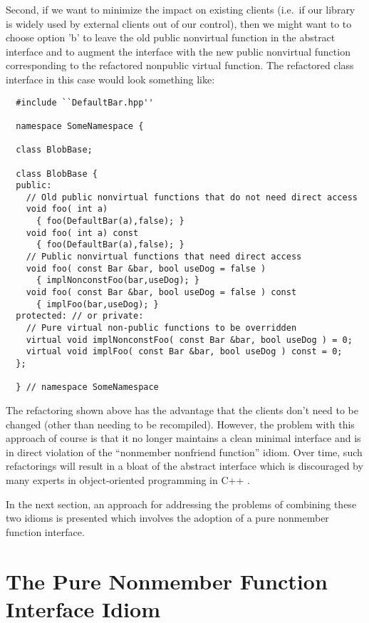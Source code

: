 \documentclass[pdf,ps2pdf,11pt]{SANDreport}
\begin{document}
Second, if we want to minimize the impact on existing clients (i.e.\ if our
library is widely used by external clients out of our control), then we might
want to to choose option 'b' to leave the old public nonvirtual function in
the abstract interface and to augment the interface with the new public
nonvirtual function corresponding to the refactored nonpublic virtual
function.  The refactored class interface in this case would look something
like:

{\small\begin{verbatim}
  #include ``DefaultBar.hpp''

  namespace SomeNamespace {

  class BlobBase;

  class BlobBase {
  public:
    // Old public nonvirtual functions that do not need direct access
    void foo( int a)
      { foo(DefaultBar(a),false); }
    void foo( int a) const
      { foo(DefaultBar(a),false); }
    // Public nonvirtual functions that need direct access
    void foo( const Bar &bar, bool useDog = false )
      { implNonconstFoo(bar,useDog); }
    void foo( const Bar &bar, bool useDog = false ) const
      { implFoo(bar,useDog); }
  protected: // or private:
    // Pure virtual non-public functions to be overridden
    virtual void implNonconstFoo( const Bar &bar, bool useDog ) = 0;
    virtual void implFoo( const Bar &bar, bool useDog ) const = 0;
  };

  } // namespace SomeNamespace
\end{verbatim}}

The refactoring shown above has the advantage that the clients don't need to
be changed (other than needing to be recompiled).  However, the problem with
this approach of course is that it no longer maintains a clean minimal
interface and is in direct violation of the ``nonmember nonfriend function''
idiom.  Over time, such refactorings will result in a bloat of the abstract
interface which is discouraged by many experts in object-oriented programming
in C++ {}\cite[Item 33]{C++CodingStandards05}.

In the next section, an approach for addressing the problems of combining
these two idioms is presented which involves the adoption of a pure nonmember
function interface.

%
\section{The Pure Nonmember Function Interface Idiom}
%
\end{document}
